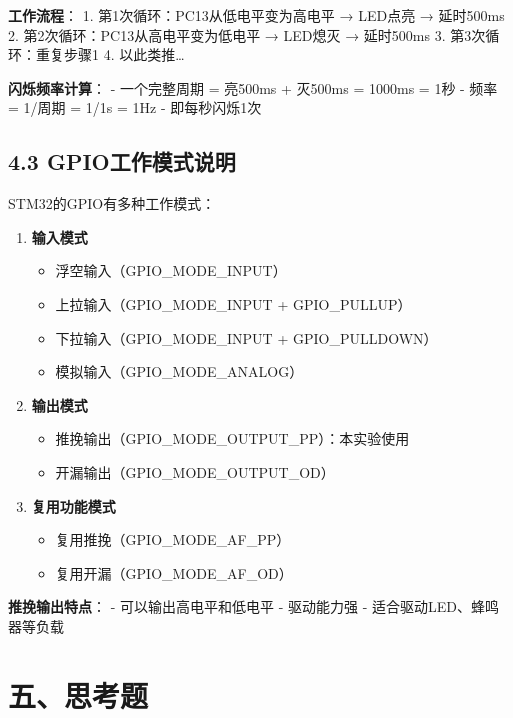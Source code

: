 \documentclass[
  chinese,
  UTF8,
  oneside,
  openany]{ctexbook}
\providecommand{\tightlist}{%
  \setlength{\itemsep}{0pt}\setlength{\parskip}{0pt}}
\begin{document}
\textbf{工作流程}： 1. 第1次循环：PC13从低电平变为高电平 → LED点亮 →
延时500ms 2. 第2次循环：PC13从高电平变为低电平 → LED熄灭 → 延时500ms 3.
第3次循环：重复步骤1 4. 以此类推\ldots{}

\textbf{闪烁频率计算}： - 一个完整周期 = 亮500ms + 灭500ms = 1000ms =
1秒 - 频率 = 1/周期 = 1/1s = 1Hz - 即每秒闪烁1次

\subsection{4.3
GPIO工作模式说明}\label{gpioux5de5ux4f5cux6a21ux5f0fux8bf4ux660e}

STM32的GPIO有多种工作模式：

\begin{enumerate}
\def\labelenumi{\arabic{enumi}.}
\tightlist
\item
  \textbf{输入模式}

  \begin{itemize}
  \tightlist
  \item
    浮空输入（GPIO\_MODE\_INPUT）
  \item
    上拉输入（GPIO\_MODE\_INPUT + GPIO\_PULLUP）
  \item
    下拉输入（GPIO\_MODE\_INPUT + GPIO\_PULLDOWN）
  \item
    模拟输入（GPIO\_MODE\_ANALOG）
  \end{itemize}
\item
  \textbf{输出模式}

  \begin{itemize}
  \tightlist
  \item
    推挽输出（GPIO\_MODE\_OUTPUT\_PP）：本实验使用
  \item
    开漏输出（GPIO\_MODE\_OUTPUT\_OD）
  \end{itemize}
\item
  \textbf{复用功能模式}

  \begin{itemize}
  \tightlist
  \item
    复用推挽（GPIO\_MODE\_AF\_PP）
  \item
    复用开漏（GPIO\_MODE\_AF\_OD）
  \end{itemize}
\end{enumerate}

\textbf{推挽输出特点}： - 可以输出高电平和低电平 - 驱动能力强 -
适合驱动LED、蜂鸣器等负载

\section{五、思考题}\label{ux4e94ux601dux8003ux9898}
\end{document}
